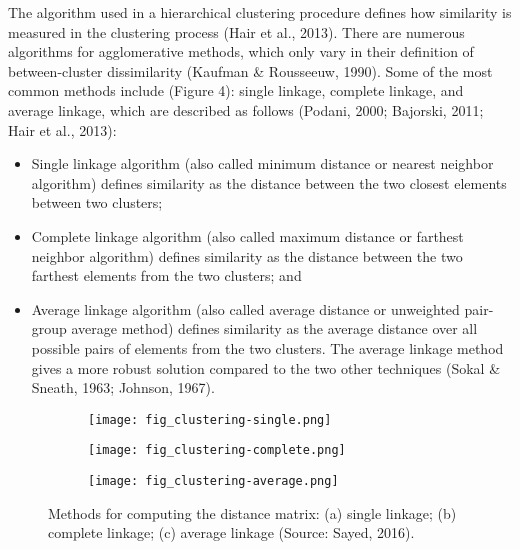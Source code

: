 The algorithm used in a hierarchical clustering procedure defines how similarity is measured in the clustering process (Hair et al., 2013). There are numerous algorithms for agglomerative methods, which only vary in their definition of between-cluster dissimilarity (Kaufman \& Rousseeuw, 1990). Some of the most common methods include (Figure 4): single linkage, complete linkage, and average linkage, which are described as follows (Podani, 2000; Bajorski, 2011; Hair et al., 2013):

\begin{itemize}
	\item Single linkage algorithm (also called minimum distance or nearest neighbor algorithm) defines similarity as the distance between the two closest elements between two clusters;
	\item Complete linkage algorithm (also called maximum distance or farthest neighbor algorithm) defines similarity as the distance between the two farthest elements from the two clusters; and
	\item Average linkage algorithm (also called average distance or unweighted pair-group average method) defines similarity as the average distance over all possible pairs of elements from the two clusters. The average linkage method gives a more robust solution compared to the two other techniques (Sokal \& Sneath, 1963; Johnson, 1967).
\end{itemize}

\begin{figure}[!ht] \centering
	\captionsetup[subfigure]{width=2.0in} %
	\begin{subfigure}[t]{0.32\textwidth}
		\texttt{[image: fig\_clustering-single.png]}
		\caption[Linkage methods in clustering.]{}
		\label{fig: litrev-fig2.3a}
	\end{subfigure}
	\begin{subfigure}[t]{0.32\textwidth}
		\texttt{[image: fig\_clustering-complete.png]}
		\caption[Linkage methods in clustering.]{}
		\label{fig: litrev-fig2.3b}
	\end{subfigure}
	\begin{subfigure}[t]{0.32\textwidth}
		\texttt{[image: fig\_clustering-average.png]}
		\caption[Linkage methods in clustering.]{}
		\label{fig: litrev-fig2.3c}
	\end{subfigure}
	\caption[Methods for computing the distance matrix: (a) single linkage; (b) complete linkage; (c) average linkage.]{Methods for computing the distance matrix: (a) single linkage; (b) complete linkage; (c) average linkage (Source: Sayed, 2016).}
	\label{fig: litrev-fig2.3}
\end{figure}

